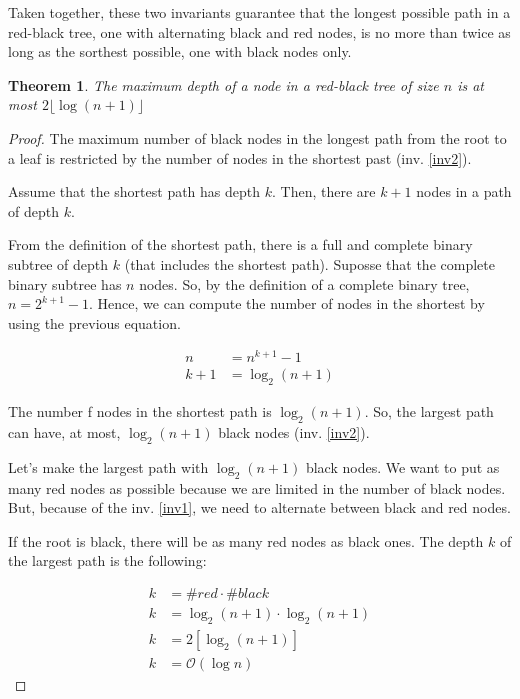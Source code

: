 \documentclass[12pt, a4paper]{article} %
\newtheorem{theorem}{Theorem}[section]
\begin{document}
Taken together, these two invariants guarantee that the longest possible path in a red-black tree, one with alternating black and red nodes, is no more than twice as long as the sorthest possible, one with black nodes only.

\begin{theorem}\label{t:balance}
  The maximum depth of a node in a red-black tree of size $n$ is at most $2\lfloor \log (n+1) \rfloor$
\end{theorem}

\begin{proof}\label{p:balance}
  The maximum number of black nodes in the longest path from the root to a leaf is restricted by the number of nodes in the shortest past (inv. \ref{inv2}).

  Assume that the shortest path has depth $k$. Then, there are $k+1$ nodes in a path of depth $k$.

  From the definition of the shortest path, there is a full and complete binary subtree of depth $k$ (that includes the shortest path). Suposse that the complete binary subtree has $n$ nodes. So, by the definition of a complete binary tree, $n = 2^{k+1} -1$. Hence, we can compute the number of nodes in the shortest by using the previous equation.

  \begin{align*}
    n     &= n^{k+1}-1 \\
    k + 1 &= \log_2 (n+1)
  \end{align*}

  The number f nodes in the shortest path is $\log_2 (n+1)$. So, the largest path can have, at most, $\log_2 (n+1)$ black nodes (inv. \ref{inv2}).

  Let's make the largest path with $\log_2 (n+1)$ black nodes. We want to put as many red nodes as possible because we are limited in the number of black nodes. But, because of the inv. \ref{inv1}, we need to alternate between black and red nodes.

  If the root is black, there will be as many red nodes as black ones. The depth $k$ of the largest path is the following:

  \begin{align*}
    k &= \#red \cdot \#black \\
    k &= \log_2 (n+1) \cdot \log_2 (n+1) \\
    k &= 2[ \log_2 (n+1) ] \\
    k &= \mathcal{O}(\log n)
  \end{align*}

\end{proof}
\end{document}
